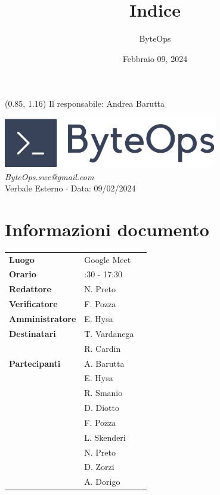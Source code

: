 \documentclass{article}
\title{\textbf{\fontsize{28}{6}\selectfont Indice}}
\author{\fontsize{14}{6}\selectfont ByteOps}
\date{Febbraio 09, 2024}
\begin{document}
\begin{textblock*}{\textwidth}(0.85\textwidth, 1.16\textheight)
    Il responsabile: Andrea Barutta
\end{textblock*}

\pagestyle{fancy}
\begin{center}
\includegraphics[width = 0.7\textwidth]{../../Images/logo.png} \\
\vspace{0.2cm}
\textcolor[RGB]{60, 60, 60}{\textit{ByteOps.swe@gmail.com}} \\
\vspace{1cm}
\fontsize{16}{6}\selectfont Verbale Esterno $\cdot$ Data: 09/02/2024 \\
\vspace{0.5cm}
\end{center}

\section*{Informazioni documento}
\def\arraystretch{1.2}
\begin{tabular}{>{\raggedleft\arraybackslash}p{}|>{\raggedright\arraybackslash}p{}c}
\hline
\addlinespace
\textbf{Luogo} & Google Meet \vspace{10pt} \\
\textbf{Orario} & 16:30 - 17:30 \vspace{10pt} \\
\textbf{Redattore} & N. Preto \vspace{10pt} \\
\textbf{Verificatore} & F. Pozza \vspace{10pt} \\
\textbf{Amministratore} & E. Hysa \vspace{10pt} \\
\textbf{Destinatari} & T. Vardanega \\ & R. Cardin \vspace{10pt} \\
\textbf{Partecipanti} & A. Barutta \\ & E. Hysa \\ & R. Smanio \\ & D. Diotto \\ & F. Pozza \\ & L. Skenderi \\ & N. Preto \\ & D. Zorzi \\ & A. Dorigo \vspace{10pt}
\end{tabular}
\pagebreak 
\end{document}
